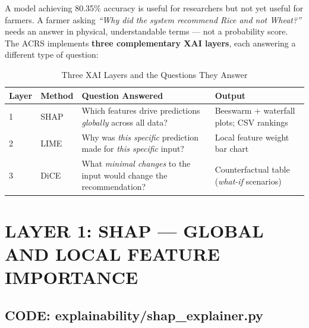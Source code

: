 \documentclass[12pt,a4paper,oneside]{report}
\begin{document}
A model achieving 80.35\% accuracy is useful for researchers but not yet useful for farmers. A farmer asking \textit{``Why did the system recommend Rice and not Wheat?''} needs an answer in physical, understandable terms --- not a probability score. The ACRS implements \textbf{three complementary XAI layers}, each answering a different type of question:

\begin{table}[H]
\centering
\caption{Three XAI Layers and the Questions They Answer}
\label{tab:xai_layers}
\renewcommand{\arraystretch}{1.4}
\begin{tabular}{p{1.5cm} p{2cm} p{4cm} p{5.5cm}}
\toprule
\textbf{Layer} & \textbf{Method} & \textbf{Question Answered} & \textbf{Output} \\
\midrule
1 & SHAP & Which features drive predictions \textit{globally} across all data? & Beeswarm + waterfall plots; CSV rankings \\
2 & LIME & Why was \textit{this specific} prediction made for \textit{this specific} input? & Local feature weight bar chart \\
3 & DiCE & What \textit{minimal changes} to the input would change the recommendation? & Counterfactual table (\textit{what-if} scenarios) \\
\bottomrule
\end{tabular}
\end{table}

\section{LAYER 1: SHAP --- GLOBAL AND LOCAL FEATURE IMPORTANCE}

\subsection{CODE: explainability/shap\_explainer.py}
\end{document}
